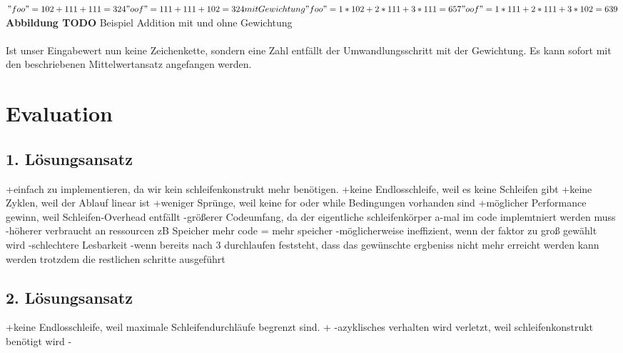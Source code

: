 \documentclass{article}
\begin{document}
    $
        "foo" = 102 + 111 + 111 = 324
        "oof" = 111 + 111 + 102 = 324
        mit Gewichtung
        "foo" = 1 * 102 + 2 * 111 + 3 * 111 = 657
        "oof" = 1 * 111 + 2 * 111 + 3 * 102 = 639
    $
    \\\textbf{Abbildung TODO} Beispiel Addition mit und ohne Gewichtung
    \\\\Ist unser Eingabewert nun keine Zeichenkette, sondern eine Zahl entfällt der Umwandlungsschritt mit der Gewichtung. Es kann sofort mit den beschriebenen Mittelwertansatz angefangen werden.
    \newpage
    \section{Evaluation}
    \label{Evaluation}
    \subsection{1. Lösungsansatz}
    +einfach zu implementieren, da wir kein schleifenkonstrukt mehr benötigen.
    +keine Endlosschleife, weil es keine Schleifen gibt
    +keine Zyklen, weil der Ablauf linear ist
    +weniger Sprünge, weil keine for oder while Bedingungen vorhanden sind
    +möglicher Performance gewinn, weil Schleifen-Overhead entfällt
    -größerer Codeumfang, da der eigentliche schleifenkörper a-mal im code implemtniert werden muss 
    -höherer verbraucht an ressourcen zB Speicher mehr code = mehr speicher
    -möglicherweise ineffizient, wenn der faktor zu groß gewählt wird
    -schlechtere Lesbarkeit
    -wenn bereits nach 3 durchlaufen feststeht, dass das gewünschte ergbeniss nicht mehr erreicht werden kann werden trotzdem die restlichen schritte ausgeführt
    \subsection{2. Lösungsansatz}
    +keine Endlosschleife, weil maximale Schleifendurchläufe begrenzt sind.
    +
    -azyklisches verhalten wird verletzt, weil schleifenkonstrukt benötigt wird
    -
    \newpage
    \renewcommand{\refname}{}
\end{document}
